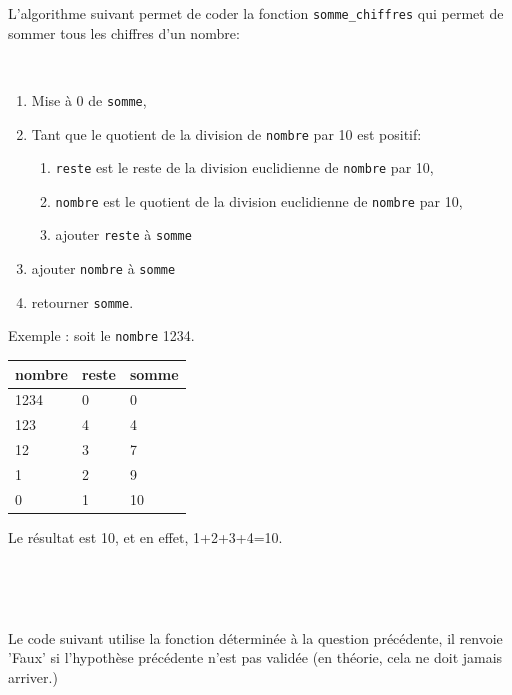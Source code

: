 L'algorithme suivant permet de coder la fonction \texttt{somme\_chiffres} qui permet de sommer tous les chiffres d'un nombre:

~\

\begin{minipage}{0.45\linewidth}
\begin{enumerate}
 \item Mise à 0 de \texttt{somme},
 \item Tant que le quotient de la division de \texttt{nombre} par 10 est positif:
 \begin{enumerate}
  \item \texttt{reste} est le reste de la division euclidienne de \texttt{nombre} par 10,
  \item \texttt{nombre} est le quotient de la division euclidienne de \texttt{nombre} par 10,
  \item ajouter \texttt{reste} à \texttt{somme}
 \end{enumerate}
 \item ajouter \texttt{nombre} à \texttt{somme}
 \item retourner \texttt{somme}.
\end{enumerate}
\end{minipage}\hfill
\begin{minipage}{0.45\linewidth}
Exemple : soit le \texttt{nombre} 1234.

\begin{center}
\begin{tabularx}{200pt}{|X|X|X|}
\hline
nombre & reste & somme \\
\hline
1234 & 0 & 0 \\
\hline
123 & 4 & 4 \\
\hline
12 & 3 & 7 \\
\hline
1 & 2 & 9 \\
\hline
0 & 1 & 10 \\
\hline
\end{tabularx}
\end{center}

Le résultat est 10, et en effet, 1+2+3+4=10.
\end{minipage}

~\


~\

Le code suivant utilise la fonction déterminée à la question précédente, il renvoie 'Faux' si l'hypothèse précédente n'est pas validée (en théorie, cela ne doit jamais arriver.)

